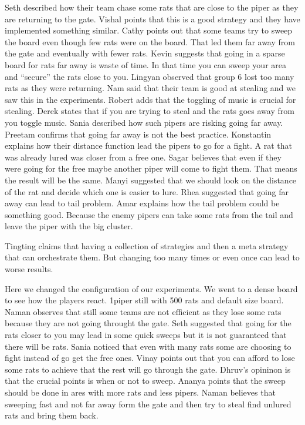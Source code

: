 Seth described how their team chase some rats that are close to the piper as they are returning to the gate.
Vishal points that this is a good strategy and they have implemented something similar.
Cathy points out that some teams try to sweep the board even though few rats were on the board. That led them far away from the gate and eventually with fewer rats.
Kevin suggests that going in a sparse board for rats far away is waste of time. In that time you can sweep your area and “secure” the rats close to you.
Lingyan observed that group 6 lost too many rats as they were returning.
Nam said that their team is good at stealing and we saw this in the experiments.
Robert adds that the toggling of music is crucial for stealing.
Derek states that if you are trying to steal and the rats goes away from you toggle music.
Sania described how such pipers are risking going far away.
Preetam confirms that going far away is not the best practice.
Konstantin explains how their distance function lead the pipers to go for a fight. A rat that was already lured was closer from a free one.
Sagar believes that even if they were going for the free maybe another piper will come to fight them. That means the result will be the same.
Manyi suggested that we should look on the distance of the rat and decide which one is easier to lure.
Rhea suggested that going far away can lead to tail problem.
Amar explains how the tail problem could be something good. Because the enemy pipers can take some rats from the tail and leave the piper with the big cluster.

Tingting claims that having a collection of strategies and then a meta strategy that can orchestrate them. But changing too many times or even once can lead to worse results.

Here we changed the configuration of our experiments. We went to a dense board to see how the players react. 1piper still with 500 rats and default size board.
Naman observes that still some teams are not efficient as they lose some rats because they are not going throught the gate.
Seth suggested that going for the rats closer to you may lead in some quick sweeps but it is not guaranteed that there will be rats.
Sania noticed that even with many rats some are choosing to fight instead of go get the free ones.
Vinay points out that you can afford to lose some rats to achieve that the rest will go through the gate.
Dhruv’s opininon is that the crucial points is when or not to sweep.
Ananya points that the sweep should be done in ares with more rats and less pipers.
Naman believes that sweeping fast and not far away form the gate and then try to steal find unlured rats and bring them back.

